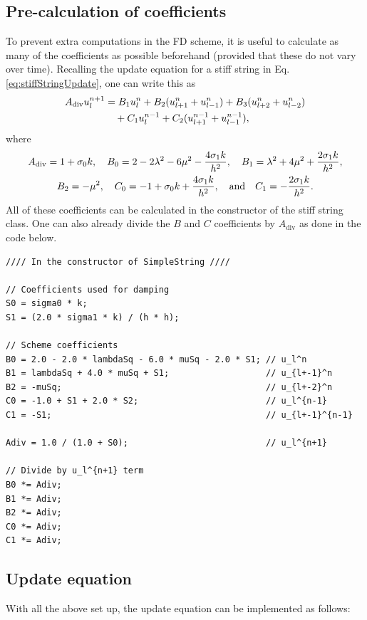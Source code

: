 \subsection{Pre-calculation of coefficients}
To prevent extra computations in the FD scheme, it is useful to calculate as many of the coefficients as possible beforehand (provided that these do not vary over time). Recalling the update equation for a stiff string in Eq. \eqref{eq:stiffStringUpdate}, one can write this as
\begin{equation}
    \begin{aligned}
        A_\text{div} u_l^{n+1} &= B_1 u_l^n + B_2 (u_{l+1}^n + u_{l-1}^n) + B_3(u_{l+2}^n + u_{l-2}^n) \\
        &\quad+ C_1u_l^{n-1}+ C_2(u_{l+1}^{n-1} + u_{l-1}^{n-1}),
    \end{aligned}
    \end{equation}
where
\begin{gather*}
    A_\text{div} = 1+\sigma_{0} k, \quad B_0 = 2 - 2\lambda^2 - 6\mu^2 - \frac{4\sigma_{1} k}{h^2}, \quad B_1 = \lambda^2 + 4\mu^2 + \frac{2\sigma_{1} k}{h^2},\\
    B_2 = - \mu^2, \quad C_0 = -1+\sigma_{0} k + \frac{4\sigma_{1} k}{h^2},\quad \text{and} \quad C_1 = - \frac{2\sigma_{1} k}{h^2}.
\end{gather*}
All of these coefficients can be calculated in the constructor of the stiff string class. One can also already divide the $B$ and $C$ coefficients by $A_\text{div}$ as done in the code below.
\setlstCpp
\begin{lstlisting}[]
//// In the constructor of SimpleString ////

// Coefficients used for damping
S0 = sigma0 * k;
S1 = (2.0 * sigma1 * k) / (h * h);

// Scheme coefficients
B0 = 2.0 - 2.0 * lambdaSq - 6.0 * muSq - 2.0 * S1; // u_l^n
B1 = lambdaSq + 4.0 * muSq + S1;                   // u_{l+-1}^n
B2 = -muSq;                                        // u_{l+-2}^n
C0 = -1.0 + S1 + 2.0 * S2;                         // u_l^{n-1}
C1 = -S1;                                          // u_{l+-1}^{n-1}

Adiv = 1.0 / (1.0 + S0);                           // u_l^{n+1}

// Divide by u_l^{n+1} term
B0 *= Adiv;
B1 *= Adiv;
B2 *= Adiv;
C0 *= Adiv;
C1 *= Adiv;
\end{lstlisting}
\pagebreak
\subsection{Update equation}\label{sec:updateEquationCpp}
With all the above set up, the update equation can be implemented as follows:

